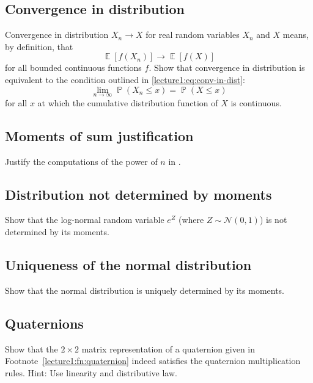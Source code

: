 \documentclass[letterpaper,11pt,oneside,reqno]{book}
\numberwithin{equation}{chapter}  %
\theoremstyle{definition}
\begin{document}
\subsection{Convergence in distribution}
\label{lecture1:prob:conv-in-dist-problem}

Convergence in distribution $X_n\to X$
for real random variables $X_n$ and $X$ means, by definition,
that
\begin{equation*}
	\operatorname{\mathbb{E}}[f(X_n)] \to \operatorname{\mathbb{E}}[f(X)]
\end{equation*}
for all bounded continuous functions $f$.
Show that convergence in distribution
is equivalent to the condition outlined in \eqref{lecture1:eq:conv-in-dist}:
\begin{equation*}
	\lim_{n \to \infty} \operatorname{\mathbb{P}}(X_n \leq x) = \operatorname{\mathbb{P}}(X \leq x)
\end{equation*}
for all $x$ at which the cumulative distribution function of $X$ is continuous.

\subsection{Moments of sum justification}

Justify the computations of the power of $n$ in
.

\subsection{Distribution not determined by moments}

Show that the log-normal random variable
$e^{Z}$ (where $Z\sim \mathcal{N}(0,1)$)
is not determined by its moments.

\subsection{Uniqueness of the normal distribution}
\label{lecture1:prob:uniqueness-normal}

Show that the normal distribution is uniquely determined by its moments.

\subsection{Quaternions}

Show that the $2\times 2$ matrix representation of a quaternion
given in Footnote~\ref{lecture1:fn:quaternion}
indeed satisfies the quaternion multiplication rules.
Hint: Use linearity and distributive law.
\end{document}
